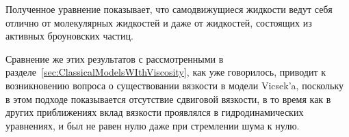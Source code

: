	Полученное уравнение показывает, что самодвижущиеся жидкости ведут себя отлично от молекулярных жидкостей и даже от жидкостей, состоящих из активных броуновских частиц.

	Сравнение же этих результатов с рассмотренными в разделе~\ref{sec:ClassicalModelsWIthViscosity}, как уже говорилось, приводит к возникновению вопроса о существовании вязкости в модели Vicsek'a, поскольку в этом подходе показывается отсутствие сдвиговой вязкости, в то время как в других приближениях вклад вязкости проявлялся в гидродинамических уравнениях, и был не равен нулю даже при стремлении шума к нулю.